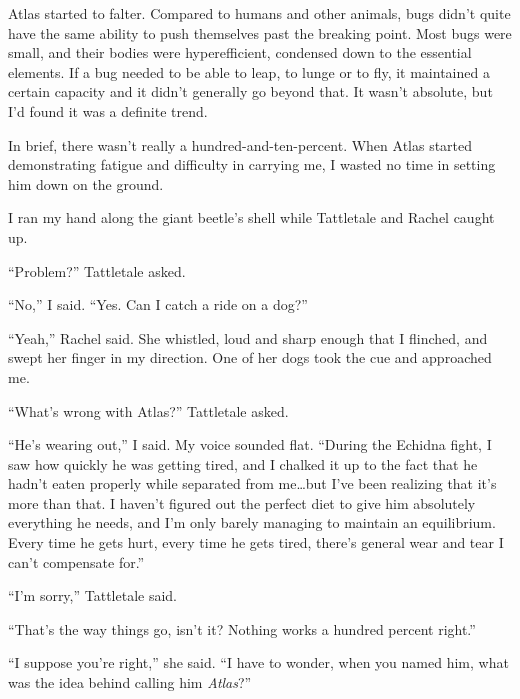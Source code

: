 





Atlas started to falter.  Compared to humans and other animals, bugs didn't quite have the same ability to push themselves past the breaking point.  Most bugs were small, and their bodies were hyperefficient, condensed down to the essential elements.  If a bug needed to be able to leap, to lunge or to fly, it maintained a certain capacity and it didn't generally go beyond that.  It wasn't absolute, but I'd found it was a definite trend.



In brief, there wasn't really a hundred-and-ten-percent.  When Atlas started demonstrating fatigue and difficulty in carrying me, I wasted no time in setting him down on the ground.



I ran my hand along the giant beetle's shell while Tattletale and Rachel caught up.



``Problem?'' Tattletale asked.



``No,'' I said.  ``Yes.  Can I catch a ride on a dog?''



``Yeah,'' Rachel said.  She whistled, loud and sharp enough that I flinched, and swept her finger in my direction.  One of her dogs took the cue and approached me.



``What's wrong with Atlas?'' Tattletale asked.



``He's wearing out,'' I said.  My voice sounded flat.  ``During the Echidna fight, I saw how quickly he was getting tired, and I chalked it up to the fact that he hadn't eaten properly while separated from me\ldots but I've been realizing that it's more than that.  I haven't figured out the perfect diet to give him absolutely everything he needs, and I'm only barely managing to maintain an equilibrium.  Every time he gets hurt, every time he gets tired, there's general wear and tear I can't compensate for.''



``I'm sorry,'' Tattletale said.



``That's the way things go, isn't it?  Nothing works a hundred percent right.''



``I suppose you're right,'' she said.  ``I have to wonder, when you named him, what was the idea behind calling him \emph{Atlas}?''



